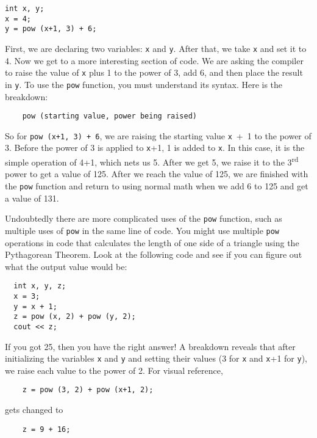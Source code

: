 \begin{lstlisting}
int x, y;
x = 4;
y = pow (x+1, 3) + 6;
\end{lstlisting}

	First, we are declaring two variables: \texttt{x} and \texttt{y}. 
	After that, we take \texttt{x} and set it to 4. 
	Now we get to a more interesting section of code. 
	We are asking the compiler to raise the value of \texttt{x} plus 1 to the power of 3, add 6, and then place the result in \texttt{y}. 
	To use the \texttt{pow} function, you must understand its syntax. 
	Here is the breakdown:

\begin{lstlisting}
	pow (starting value, power being raised)
\end{lstlisting}

 	So for \texttt{pow (x+1, 3) + 6}, we are raising the starting value \texttt{x}~+~1 to the power of 3. 
 	Before the power of 3 is applied to \texttt{x}+1, 1 is added to \texttt{x}. 
 	In this case, it is the simple operation of 4+1, which nets us 5. 
 	After we get 5, we raise it to the 3\textsuperscript{rd} power to get a value of 125. 
 	After we reach the value of 125, we are finished with the \texttt{pow} function and return to using normal math when we add 6 to 125 and get a value of 131.  
	

	Undoubtedly there are more complicated uses of the \texttt{pow} function, such as multiple uses of \texttt{pow} in the same line of code. 
	You might use multiple \texttt{pow} operations in code that calculates the length of one side of a triangle using the Pythagorean Theorem. 
	Look at the following code and see if you can figure out what the output value would be:

\begin{lstlisting}
  int x, y, z;
  x = 3;
  y = x + 1;
  z = pow (x, 2) + pow (y, 2);
  cout << z;
\end{lstlisting}

	If you got 25, then you have the right answer! 
	A breakdown reveals that after initializing the variables \texttt{x} and \texttt{y} and setting their values (3 for \texttt{x} and \texttt{x}+1 for \texttt{y}), we raise each value to the power of 2. 
	For visual reference,

\begin{lstlisting}
	z = pow (3, 2) + pow (x+1, 2);
\end{lstlisting}
gets changed to
\begin{lstlisting}
	z = 9 + 16;
\end{lstlisting}	
	
